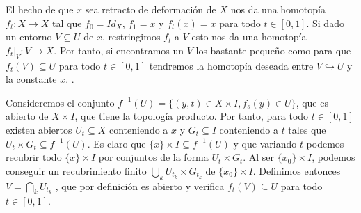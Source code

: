 \documentclass[twoside]{article}
\begin{document}
\begin{solucion}
El hecho de que $x$ sea retracto de deformación de $X$ nos da una homotopía $f_t:X\to X$ tal que $f_0=Id_X$, $f_1=x$ y $f_t(x)=x$ para todo $t\in[0,1]$. Si dado un entorno $V\subseteq U$ de $x$, restringimos $f_t$ a $V$ esto nos da una homotopía $f_t|_V: V\to X$. Por tanto, si encontramos un $V$ los bastante pequeño como para que $f_t(V)\subseteq U$ para todo $t\in [0,1]$ tendremos la homotopía deseada entre $V\hookrightarrow U$ y la constante $x$. . 

Consideremos el conjunto $f^{-1}(U)=\{(y,t)\in X\times I, f_s(y)\in U\}$, que es abierto de $X\times I$, que tiene la topología producto. Por tanto, para todo $t\in [0,1]$ existen abiertos $U_t\subseteq X$ conteniendo a $x$ y $G_t\subseteq I$ conteniendo a $t$ tales que $U_t\times G_t\subseteq f^{-1}(U)$. Es claro que $\{x\}\times I\subseteq f^{-1}(U)$ y que variando $t$ podemos recubrir todo $\{x\}\times I$ por conjuntos de la forma $U_t\times G_t$. Al ser $\{x_0\}\times I$, podemos conseguir un recubrimiento finito $\bigcup_k U_{t_k}\times G_{t_k}$ de $\{x_0\}\times I$. Definimos entonces $V=\bigcap_k U_{t_k}$ , que por definición es abierto y verifica $f_t(V)\subseteq U$ para todo $t\in [0,1]$. 


\end{solucion}
\end{document}
